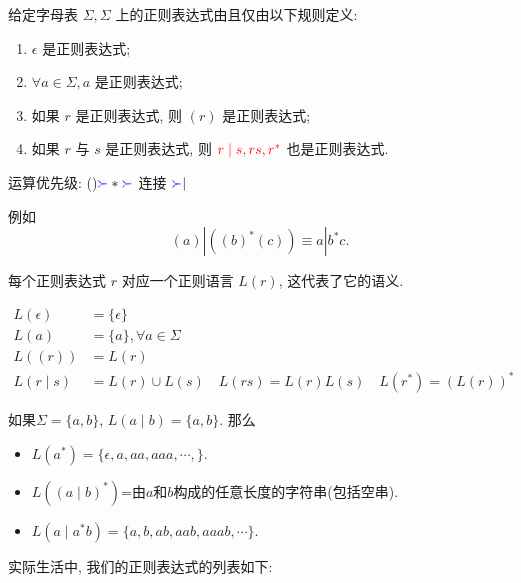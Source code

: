 \documentclass{ctexart}
\begin{document}
\begin{definition}[正则表达式]
    给定字母表 $\Sigma, \Sigma$ 上的正则表达式由且仅由以下规则定义:
\begin{enumerate}
    \item $\epsilon$ 是正则表达式;
    \item $\forall a \in \Sigma, a$ 是正则表达式;
    \item 如果 $r$ 是正则表达式, 则 $(r)$ 是正则表达式;
    \item 如果 $r$ 与 $s$ 是正则表达式, 则 ${{\color{red}r \mid s, r s, r^*}}$ 也是正则表达式.
\end{enumerate}
运算优先级: ()${{\color{blue}\succ}} * {{\color{blue}\succ}}$ 连接 ${{\color{blue}\succ}} |$
\end{definition}

例如
$$
(a)\left|\left((b)^*(c)\right) \equiv a\right| b^* c.
$$

每个正则表达式 $r$ 对应一个正则语言 $L(r)$, 这代表了它的语义. 

\begin{definition}[正则表达式对应的正则语言]
$$
\begin{aligned}
L(\epsilon)&=\{\epsilon\} \\
L(a)&=\{a\}, \forall a \in \Sigma \\
L((r))&=L(r) \\
L(r \mid s)&=L(r) \cup L(s) \quad L(r s)=L(r) L(s) \quad L\left(r^*\right)=(L(r))^*
\end{aligned}
$$
\end{definition}

\begin{example}
    如果$\Sigma=\{a, b\}$, $L(a \mid b)=\{a, b\}$. 那么
    \begin{itemize}
        \item $L\left(a^*\right)=\{\epsilon, a, aa, aaa, \cdots, \}$.
        \item $L\left((a \mid b)^*\right)$=由$a$和$b$构成的任意长度的字符串(包括空串). 
        \item $ L\left(a \mid a^* b\right)=\{a, b, a b, a a b,  aaab, \cdots\} $. 
    \end{itemize}
\end{example}

实际生活中, 我们的正则表达式的列表如下: 
\end{document}
